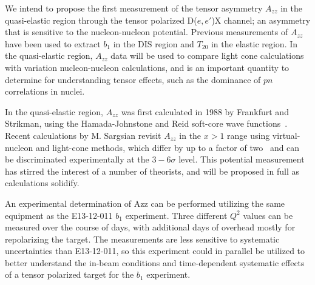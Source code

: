We intend to propose the first measurement of the tensor asymmetry $A_{zz}$ in the quasi-elastic region through the tensor polarized D($e,e'$)X channel; an asymmetry that is sensitive to the nucleon-nucleon potential.  Previous measurements of $A_{zz}$ have been used to extract $b_1$ in the DIS region and $T_{20}$ in the elastic region. In the quasi-elastic region, $A_{zz}$ data will be used to compare light cone calculations with variation nucleon-nucleon calculations, and is an important quantity to determine for understanding tensor effects, such as the dominance of $pn$ correlations in nuclei.

In the quasi-elastic region, $A_{zz}$ was first calculated in 1988 by Frankfurt and Strikman, using the Hamada-Johnstone and Reid soft-core wave functions~\cite{Frankfurt:1988nt}. Recent calculations by
M. Sargsian revisit $A_{zz}$ in the $x > 1$ range using virtual-nucleon and light-cone methods, which differ by up to a factor of two~\cite{MISAK} and can be discriminated experimentally at the $3-6\sigma$ level. This potential measurement has stirred the interest of a number of theorists, and will be proposed in full as calculations solidify.

An experimental determination of Azz can be performed utilizing the same equipment as the E13-12-011 $b_1$ experiment.  Three different $Q^2$ values can be measured over the course of \productiondays days, with \overheaddays additional days of overhead mostly for repolarizing the target. The measurements are less sensitive to systematic uncertainties than E13-12-011, so this experiment could in parallel be utilized to better understand the in-beam conditions and time-dependent systematic effects of a tensor polarized target for the $b_1$ experiment.





